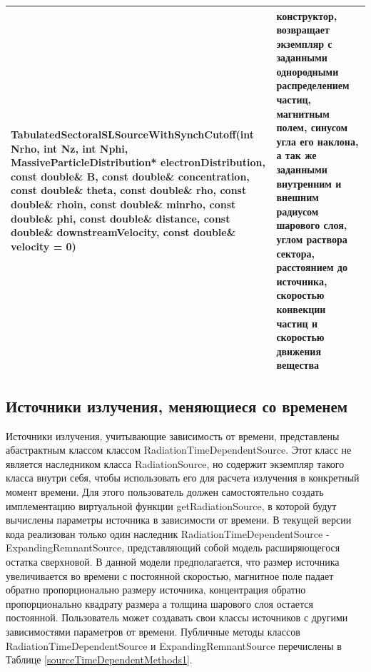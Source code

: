 \begin{small}
\begin{xtabular}{|p{0.5\textwidth}|p{0.5\textwidth}|}
		\hline
		TabulatedSectoralSLSourceWithSynchCutoff(int Nrho, int Nz, int Nphi, MassiveParticleDistribution* electronDistribution, const double\& B, const double\& concentration, const double\& theta, const double\& rho, const double\& rhoin, const double\& minrho, const double\& phi, const double\& distance, const double\& downstreamVelocity, const double\& velocity = 0) & конструктор, возвращает экземпляр с заданными однородными распределением частиц, магнитным полем, синусом угла его наклона, а так же заданными внутренним и внешним радиусом шарового слоя, углом раствора сектора, расстоянием до источника, скоростью конвекции частиц и скоростью движения вещества\\
		\hline
	\end{xtabular}
\end{small}

\subsection{Источники излучения, меняющиеся со временем}\label{timeDependentSource}
Источники излучения, учитывающие зависимость от времени, представлены абастрактным классом классом RadiationTimeDependentSource. Этот класс не является наследником класса RadiationSource, но содержит экземпляр такого класса внутри себя, чтобы использовать его для расчета излучения в конкретный момент времени. Для этого пользователь должен самостоятельно создать имплементацию виртуальной функции getRadiationSource, в которой будут вычислены параметры источника в зависимости от времени.  В текущей версии кода реализован только один наследник RadiationTimeDependentSource - ExpandingRemnantSource, представляющий собой модель расширяющегося остатка сверхновой. В данной модели предполагается, что размер источника увеличивается во времени с постоянной скоростью, магнитное поле падает обратно пропорционально размеру источника, концентрация обратно пропорционально квадрату размера а толщина шарового слоя остается постоянной. Пользователь может создавать свои классы источников с другими зависимостями параметров от времени. Публичные методы классов RadiationTimeDependentSource и ExpandingRemnantSource перечислены  в Таблице \ref{sourceTimeDependentMethods1}.

